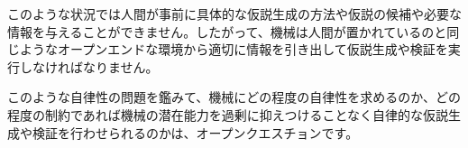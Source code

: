 このような状況では人間が事前に具体的な仮説生成の方法や仮説の候補や必要な情報を与えることができません。したがって、機械は人間が置かれているのと同じようなオープンエンドな環境から適切に情報を引き出して仮説生成や検証を実行しなければなりません。

このような自律性の問題を鑑みて、機械にどの程度の自律性を求めるのか、どの程度の制約であれば機械の潜在能力を過剰に抑えつけることなく自律的な仮説生成や検証を行わせられるのかは、オープンクエスチョンです。





